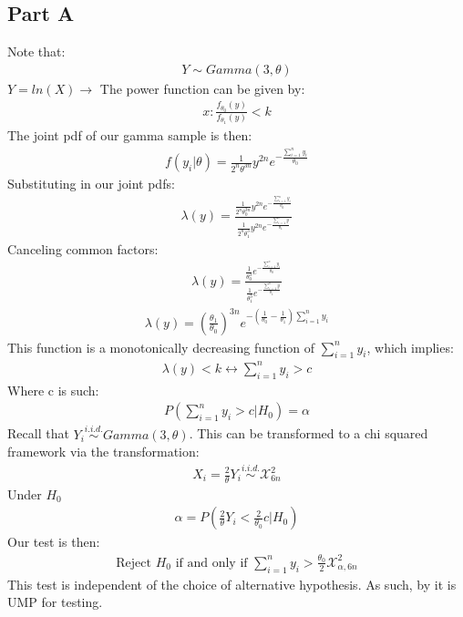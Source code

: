 \documentclass{article}
\begin{document}
\subsection*{Part A}
Note that:
\begin{align*}
Y \sim  Gamma(3,\theta)
\end{align*}
$Y=ln(X) \rightarrow $
The power function can be given by:
\begin{align*}
x: \frac{f_{\theta_0}(y)}{f_{\theta_1}(y)} < k
\end{align*}
The joint pdf of our gamma sample is then:
\begin{align*}
f(y_i|\theta) = \frac{1}{2^n\theta^{3n}} y^{2n} e^{-\frac{\sum_{i=1}^{n} y_i}{\theta_0}}
\end{align*}
Substituting in our joint pdfs:
\begin{align*}
\lambda(y) = \frac{\frac{1}{2^n\theta_0^{3n}} y^{2n} e^{-\frac{\sum_{i=1}^{n} y_i}{\theta_0}}}{\frac{1}{2^n\theta_1^3} y^{2n} e^{-\frac{\sum_{i=1}^{n}y}{\theta_1}}}
\end{align*}
Canceling common factors:
\begin{align*}
\lambda(y) = \frac{\frac{1}{\theta_0^{3}} e^{-\frac{\sum_{i=1}^{n} y_i}{\theta_0}}}{\frac{1}{\theta_1^3} e^{-\frac{\sum_{i=1}^{n}y}{\theta_1}}}
\end{align*}
\begin{align*}
\lambda(y) = (\frac{\theta_1}{\theta_0})^{3n} e^{-(\frac{1}{\theta_0}-\frac{1}{\theta_1})\sum_{i=1}^{n} y_i }
\end{align*}
This function is a monotonically decreasing function of $\sum_{i=1}^{n} y_i$, which implies:
\begin{align*}
\lambda(y) < k \leftrightarrow \sum_{i=1}^{n} y_i > c
\end{align*}
Where c is such:
\begin{align*}
P(\sum_{i=1}^{n} y_i > c | H_0) = \alpha
\end{align*}
Recall that $Y_i \overset{i.i.d.}{\sim}  Gamma(3,\theta)$. This can be transformed to a chi squared framework via the transformation:
\begin{align*}
X_i = \frac{2}{\theta} Y_i \overset{i.i.d.}{\sim} \mathcal{X}_{6n}^{2}
\end{align*}
Under $H_0$
\begin{align*}
\alpha = P(\frac{2}{\theta} Y_i < \frac{2}{\theta_0} c|H_0)
\end{align*}
Our test is then:
\begin{align*}
\text{Reject } H_0 \text{ if and only if } \sum_{i=1}^{n} y_i > \frac{\theta_0}{2}\mathcal{X}_{\alpha,6n}^{2}
\end{align*}
This test is independent of the choice of alternative hypothesis. As such, by it is UMP for testing.
\clearpage
\end{document}

